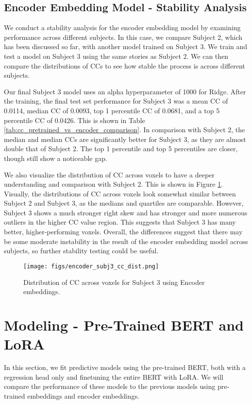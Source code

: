 \documentclass[10pt,letterpaper]{article}
\begin{document}
\subsection{Encoder Embedding Model - Stability Analysis}
We conduct a stability analysis for the encoder embedding model by examining performance across different subjects. In this case, we compare Subject 2, which has been discussed so far, with another model trained on Subject 3. We train and test a model on Subject 3 using the same stories as Subject 2. We can then compare the distributions of CCs to see how stable the process is across different subjects.

Our final Subject 3 model uses an alpha hyperparameter of 1000 for Ridge. After the training, the final test set performance for Subject 3 was a mean CC of 0.0114, median CC of 0.0093, top 1 percentile CC of 0.0681, and a top 5 percentile CC of 0.0426. This is shown in Table \ref{tab:cc_pretrained_vs_encoder_comparison}. In comparison with Subject 2, the median and median CCs are significantly better for Subject 3, as they are almost double that of Subject 2. The top 1 percentile and top 5 percentiles are closer, though still show a noticeable gap.

We also visualize the distribution of CC across voxels to have a deeper understanding and comparison with Subject 2. This is shown in Figure \ref{fig:cc_dist_encoder_subj_3}. Visually, the distributions of CC across voxels look somewhat similar between Subject 2 and Subject 3, as the medians and quartiles are comparable. However, Subject 3 shows a much stronger right skew and has stronger and more numerous outliers in the higher CC value region. This suggests that Subject 3 has many better, higher-performing voxels. Overall, the differences suggest that there may be some moderate instability in the result of the encoder embedding model across subjects, so further stability testing could be useful.

\begin{figure}[ht]
    \centering
    \texttt{[image: figs/encoder\_subj3\_cc\_dist.png]}
    \caption{Distribution of CC across voxels for Subject 3 using Encoder embeddings.}
    \label{fig:cc_dist_encoder_subj_3}
\end{figure}

\section{Modeling - Pre-Trained BERT and LoRA}
In this section, we fit predictive models using the pre-trained BERT, both with a regression head only and finetuning the entire BERT with LoRA. We will compare the performance of these models to the previous models using pre-trained embeddings and encoder embeddings.
\end{document}
